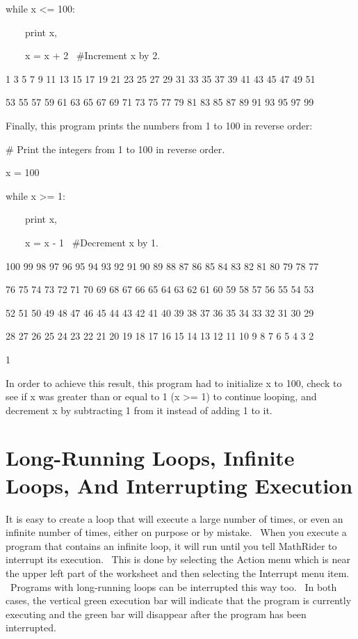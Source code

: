 \documentclass[12pt,twoside]{book}
\begin{document}
\bigskip

while x {\textless}= 100:

\ \ \ \ print x,

\ \ \ \ x = x + 2 \ \#Increment x by 2.

{\textbar}

1 3 5 7 9 11 13 15 17 19 21 23 25 27 29 31 33 35 37 39 41 43 45 47 49 51

53 55 57 59 61 63 65 67 69 71 73 75 77 79 81 83 85 87 89 91 93 95 97 99 

Finally, this program prints the numbers from 1 to 100 in reverse order:


\bigskip

\# Print the integers from 1 to 100 in reverse order.


\bigskip

x = 100 



while x {\textgreater}= 1:

\ \ \ \ print x,

\ \ \ \ x = x {}- 1 \ \#Decrement x by 1.

{\textbar}

100 99 98 97 96 95 94 93 92 91 90 89 88 87 86 85 84 83 82 81 80 79 78 77

76 75 74 73 72 71 70 69 68 67 66 65 64 63 62 61 60 59 58 57 56 55 54 53

52 51 50 49 48 47 46 45 44 43 42 41 40 39 38 37 36 35 34 33 32 31 30 29

28 27 26 25 24 23 22 21 20 19 18 17 16 15 14 13 12 11 10 9 8 7 6 5 4 3 2

1 


\bigskip

In order to achieve this result, this program had to initialize x to
100, check to see if x was greater than or equal to 1 (x
{\textgreater}= 1) to continue looping, and decrement x by subtracting
1 from it instead of adding 1 to it.

\section[Long-Running Loops, Infinite Loops, And Interrupting Execution]{
Long-Running Loops, Infinite Loops, And Interrupting Execution}

It is easy to create a loop that will execute a large number of times,
or even an infinite number of times, either on purpose or by mistake.
\ When you execute a program that contains an infinite loop, it will
run until you tell MathRider to interrupt its execution. \ This is done
by selecting the Action menu which is near the upper left part of the
worksheet and then selecting the Interrupt menu item. \ Programs with
long{}-running loops can be interrupted this way too. \ In both cases,
the vertical green execution bar will indicate that the program is
currently executing and the green bar will disappear after the program
has been interrupted. 
\end{document}
